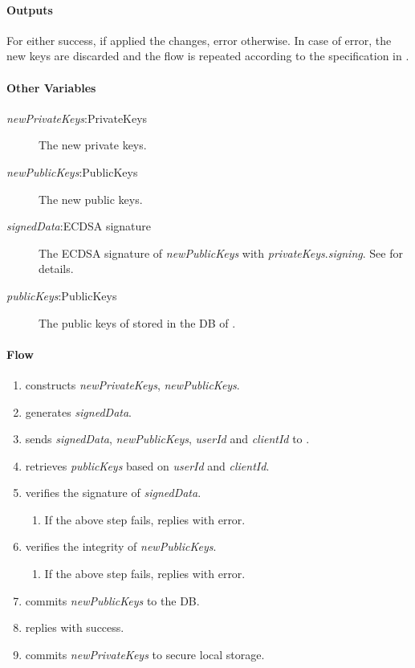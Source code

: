 \documentclass[a4paper,10pt]{article}
\newcommand{\signedData}{\emph{signedData}}
\newcommand{\newPublicKeys}{\emph{newPublicKeys}}
\newcommand{\newPrivateKeys}{\emph{newPrivateKeys}}
\newcommand{\privateKeys}{\emph{privateKeys}}
\newcommand{\publicKeys}{\emph{publicKeys}}
\newcommand{\signingKey}{\privateKeys{}.\emph{signing}}
\newcommand{\userId}{\emph{userId}}
\newcommand{\clientId}{\emph{clientId}}
\begin{document}
\paragraph{Outputs}
For \Client{} either success, if \Server{} applied the changes, error otherwise. In case of error, the new keys are discarded and the flow is repeated according to the 
specification in \cite{crypto_spec}.

\paragraph{Other Variables}
\SpecialItem
\begin{description}
 \item[\newPrivateKeys{}:PrivateKeys] The new private keys.
 \item[\newPublicKeys{}:PublicKeys] The new public keys.
 \item[\signedData{}:ECDSA signature] The ECDSA signature of \newPublicKeys{} with \signingKey{}. See \cite{crypto_spec} for details.
 \item[\publicKeys{}:PublicKeys] The public keys of \Client{} stored in the DB of \Server{}.
\end{description}

\paragraph{Flow}

\begin{enumerate}
 \item \Client{} constructs \newPrivateKeys{}, \newPublicKeys{}.
 \item \Client{} generates \signedData{}.
 \item \Client{} sends \signedData{}, \newPublicKeys{}, \userId{} and \clientId{} to \Server{}.
 \item \Server{} retrieves \publicKeys{} based on \userId{} and \clientId{}.
 \item \Server{} verifies the signature of \signedData{}.
 \begin{enumerate}
  \item If the above step fails, \Server{} replies with error.
 \end{enumerate}
 \item \Server{} verifies the integrity of \newPublicKeys{}.
 \begin{enumerate}
  \item If the above step fails, \Server{} replies with error.
 \end{enumerate}
 \item \Server{} commits \newPublicKeys{} to the DB.
 \item \Server{} replies with success.
 \item\label{modify_keys_flow:local_storage} \Client{} commits \newPrivateKeys{} to secure local storage.
\end{enumerate}
\end{document}
